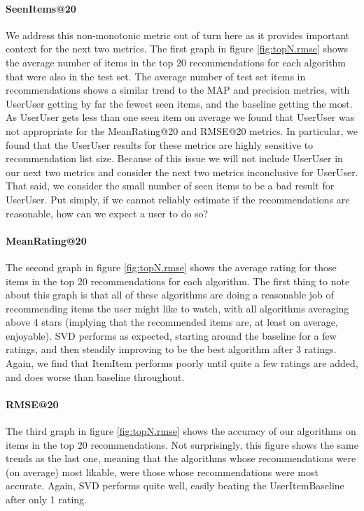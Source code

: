 \documentclass[letterpaper]{sig-alternate}
\begin{document}
  \vspace{-0.5em}
  \paragraph{SeenItems@20}
  We address this non-monotonic metric out of turn here as it provides important context for the next two metrics.
  The first graph in figure \ref{fig:topN.rmse} shows the average number of items in the top 20 recommendations for each algorithm that were also in the test set.
  The average number of test set items in recommendations shows a similar trend to the MAP and precision metrics, with UserUser getting by far the fewest seen items, and the baseline getting the most.
  As UserUser gets less than one seen item on average we found that UserUser was not appropriate for the MeanRating@20 and RMSE@20 metrics.
  In particular, we found that the UserUser results for these metrics are highly sensitive to recommendation list size.
  Because of this issue we will not include UserUser in our next two metrics and consider the next two metrics inconclusive for UserUser.
  That said, we consider the small number of seen items to be a bad result for UserUser.
  Put simply, if we cannot reliably estimate if the recommendations are reasonable, how can we expect a user to do so?

  \vspace{-0.5em}
  \paragraph{MeanRating@20}
  The second graph in figure \ref{fig:topN.rmse} shows the average rating for those items in the top 20 recommendations for each algorithm.
  The first thing to note about this graph is that all of these algorithms are doing a reasonable job of recommending items the user might like to watch, with all algorithms averaging above 4 stars (implying that the recommended items are, at least on average, enjoyable).
  SVD performs as expected, starting around the baseline for a few ratings, and then steadily improving to be the best algorithm after 3 ratings.
  Again, we find that ItemItem performs poorly until quite a few ratings are added, and does worse than baseline throughout.
    

  \vspace{-0.5em}
  \paragraph{RMSE@20}
  The third graph in figure \ref{fig:topN.rmse} shows the accuracy of our algorithms on items in the top 20 recommendations.
  Not surprisingly, this figure shows the same trends as the last one, meaning that the algorithms whose recommendations were (on average) most likable, were those whose recommendations were most accurate.
  Again, SVD performs quite well, easily beating the UserItemBaseline after only 1 rating.
  
\end{document}
